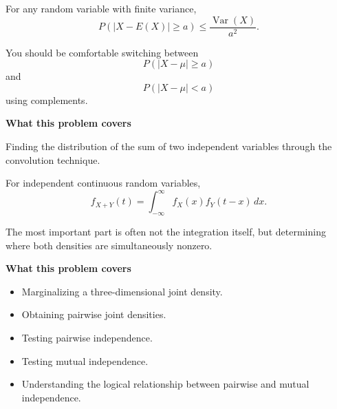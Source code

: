 \documentclass[11pt]{article}
\begin{document}
\begin{toolbox}

For any random variable with finite variance,
\[
P(|X-E(X)|\geq a)
\leq
\frac{\operatorname{Var}(X)}{a^2}.
\]

You should be comfortable switching between
\[
P(|X-\mu|\geq a)
\]
and
\[
P(|X-\mu|<a)
\]
using complements.
\end{toolbox}
 
 


\newpage

\begin{topicbox}

\textbf{What this problem covers}

Finding the distribution of the sum of two independent variables through the convolution technique.

\end{topicbox}

\begin{toolbox}

For independent continuous random variables,
\[
f_{X+Y}(t)
=
\int_{-\infty}^{\infty}
f_X(x)f_Y(t-x)\,dx.
\]

The most important part is often not the integration itself, but determining
where both densities are simultaneously nonzero.
\end{toolbox}



\newpage

\begin{topicbox}

\textbf{What this problem covers}

\begin{itemize}[leftmargin=*]
    \item Marginalizing a three-dimensional joint density.
    \item Obtaining pairwise joint densities.
    \item Testing pairwise independence.
    \item Testing mutual independence.
    \item Understanding the logical relationship between pairwise and mutual
    independence.
\end{itemize}

\end{topicbox}
\end{document}
